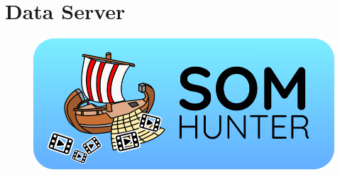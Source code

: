 \chapter{Data Server}
\label{comp-data-server}

\begin{figure}
	\centering
	\includegraphics[width=\textwidth]{img/somhunter-logo.png}
	\label{fig:logo}
\end{figure}
